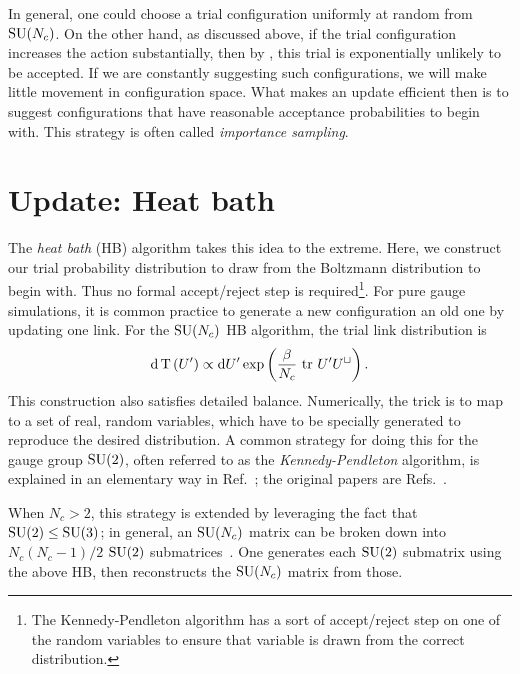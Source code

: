 In general, one could choose a trial configuration uniformly at random
from $\operatorname{SU}(N_c)$. On the other hand, as discussed above, if the trial
configuration increases the action substantially, then by
, this trial is exponentially unlikely to
be accepted. If we are constantly suggesting such configurations,
we will make little movement in configuration space.
What makes an update efficient then is to suggest configurations that
have reasonable acceptance probabilities to begin with. This
strategy is often called {\it importance sampling}.


\section{Update: Heat bath}

The {\it heat bath} (HB) algorithm takes this idea to the extreme. Here,
we construct our trial probability distribution to draw from the
Boltzmann distribution to begin with. Thus no formal accept/reject
step is required\footnote{The Kennedy-Pendleton algorithm has a sort
of accept/reject step on one of the random variables to ensure that
variable is drawn from the correct distribution.}. For pure gauge
simulations, it is common practice to generate a new configuration 
an old one by updating one link. 
For the $\operatorname{SU}(N_c)$ HB algorithm, the trial link distribution is
\begin{equation}\label{eq:PTdist}
  \dd{\operatorname{T}\left(U'\right)}\propto \dd U'\exp\left(\frac{\beta}{N_c}\,\tr\,
  U'U^\sqcup\right).
\end{equation}
This construction also satisfies detailed balance. 
Numerically, the trick is to map  to a set
of real, random variables, which have to be specially
generated to reproduce the desired distribution.
A common strategy for doing this for the gauge group $\operatorname{SU}(2)$,
often referred to as the {\it Kennedy-Pendleton} algorithm, is explained in an elementary way 
in Ref.~\cite{gattringer_quantum_2010}; the original papers are
Refs.~\cite{fabricius_heat_1984,kennedy_improved_1985}.

When $N_c>2$, this strategy is extended by leveraging the fact
that $\operatorname{SU}(2)\leq\operatorname{SU}(3)$; in general, an $\operatorname{SU}(N_c)$ matrix
can be broken down into $N_c(N_c-1)/2$ 
$\operatorname{SU}(2)$ submatrices~\cite{cabibbo_new_1982}. One generates each
$\operatorname{SU}(2)$ submatrix using the above HB, then reconstructs
the $\operatorname{SU}(N_c)$ matrix from those.


